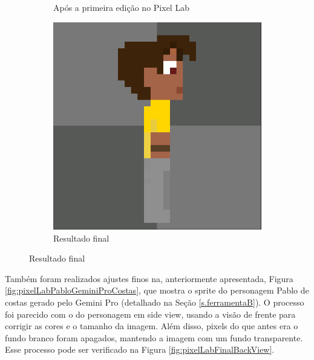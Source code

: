 \begin{figure}[htbp]
\begin{subfigure}{0.32\linewidth}
        \caption{\small Após a primeira edição no Pixel Lab}
        \label{fig:pixelLabFinalSideView2}
    \end{subfigure}
    \begin{subfigure}{0.32\linewidth}
        \centering
        \includegraphics[width=1\linewidth]{figs/pixelLab/dia3/fix_oficial_fundo_igual.PNG}
        \caption{\small Resultado final}
        \label{fig:pixelLabFinalSideView3}
    \end{subfigure}

\end{figure}

Também foram realizados ajustes finos na, anteriormente apresentada, Figura \ref{fig:pixelLabPabloGeminiProCostas}, que mostra o sprite do personagem Pablo de costas gerado pelo Gemini Pro (detalhado na Seção \ref{s.ferramentaB}). O processo foi parecido com o do personagem em side view, usando a visão de frente para corrigir as cores e o tamanho da imagem. Além disso, pixels do que antes era o fundo branco foram apagados, mantendo a imagem com um fundo transparente. Esse processo pode ser verificado na Figura \ref{fig:pixelLabFinalBackView}.

